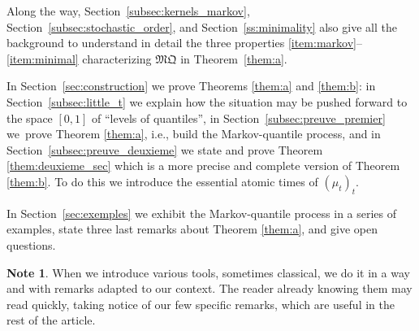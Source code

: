 \documentclass[11pt]{article}
\newcommand{\ie}{i.e.,\xspace}
\theoremstyle{plain}
\theoremstyle{definition}
\newtheorem*{note}{Note}
\newcommand{\mq}{\mathfrak{MQ}}
\begin{document}
Along the way, Section~\ref{subsec:kernels_markov}, Section~\ref{subsec:stochastic_order}, and Section~\ref{ss:minimality} also give all the background to understand in detail the three properties \eqref{item:markov}--\eqref{item:minimal} characterizing $\mq$ in Theorem~\ref{them:a}.

In Section~\ref{sec:construction} we prove Theorems \ref{them:a} and \ref{them:b}: in Section~\ref{subsec:little_t} we explain how the situation may be pushed forward to the space $[0,1]$ of ``levels of quantiles'', in Section~\ref{subsec:preuve_premier} we~prove Theorem \ref{them:a}, \ie build the Markov-quantile process, and in Section~\ref{subsec:preuve_deuxieme} we state and prove Theorem \ref{them:deuxieme_sec} which is a more precise and complete version of Theorem \ref{them:b}. To do this we introduce the essential atomic times of $(\mu_t)_t$.

In Section~\ref{sec:exemples} we exhibit the Markov-quantile process in a series of examples, state three last remarks about Theorem \ref{them:a}, and give open questions.

\begin{note} When we introduce various tools, sometimes classical, we do it in a way and with remarks adapted to our context. The reader already knowing them may read quickly, taking notice of our few specific remarks, which are useful in the rest of the article.
\end{note}
\end{document}
